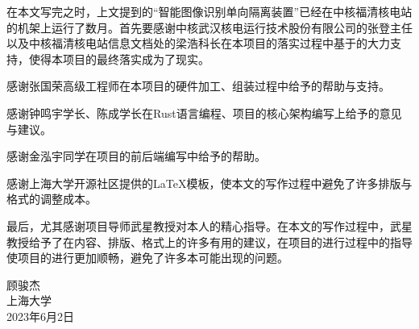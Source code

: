 \begin{acknowledgement}

在本文写完之时，上文提到的“智能图像识别单向隔离装置”已经在中核福清核电站的机架上运行了数月。首先要感谢中核武汉核电运行技术股份有限公司的张登主任以及中核福清核电站信息文档处的梁浩科长在本项目的落实过程中基于的大力支持，使得本项目的最终落实成为了现实。

感谢张国荣高级工程师在本项目的硬件加工、组装过程中给予的帮助与支持。

感谢钟鸣宇学长、陈成学长在Rust语言编程、项目的核心架构编写上给予的意见与建议。

感谢金泓宇同学在项目的前后端编写中给予的帮助。

感谢上海大学开源社区提供的LaTeX模板，使本文的写作过程中避免了许多排版与格式的调整成本。

最后，尤其感谢项目导师武星教授对本人的精心指导。在本文的写作过程中，武星教授给予了在内容、排版、格式上的许多有用的建议，在项目的进行过程中的指导使项目的进行更加顺畅，避免了许多本可能出现的问题。

\begin{flushright}
顾骏杰\\
上海大学\\
2023年6月2日\\
\end{flushright}

\end{acknowledgement}
